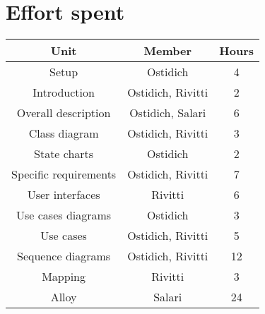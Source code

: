 \chapter{Effort spent}

\begin{table}[h]
    \centering
    \begin{tabular}{|c|c|c|}
        \hline \textbf{Unit} & \textbf{Member} & \textbf{Hours} \\
        \hline Setup & Ostidich & 4 \\
        \hline Introduction & Ostidich, Rivitti & 2 \\
        \hline Overall description & Ostidich, Salari & 6 \\
        \hline Class diagram & Ostidich, Rivitti & 3 \\
        \hline State charts & Ostidich & 2 \\
        \hline Specific requirements & Ostidich, Rivitti & 7 \\
        \hline User interfaces & Rivitti & 6 \\
        \hline Use cases diagrams & Ostidich & 3 \\
        \hline Use cases & Ostidich, Rivitti & 5 \\
        \hline Sequence diagrams & Ostidich, Rivitti & 12 \\
        \hline Mapping & Rivitti & 3 \\
        \hline Alloy & Salari & 24 \\
        \hline
    \end{tabular}
\end{table}

